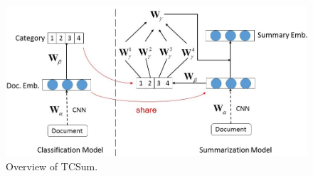 \documentclass[letterpaper]{article}
\begin{document}
\begin{figure}
	\centering
	\includegraphics[width=0.99\linewidth]{model}
	\caption{Overview of TCSum.}
	\label{fig:model}
\end{figure}


\end{document}
